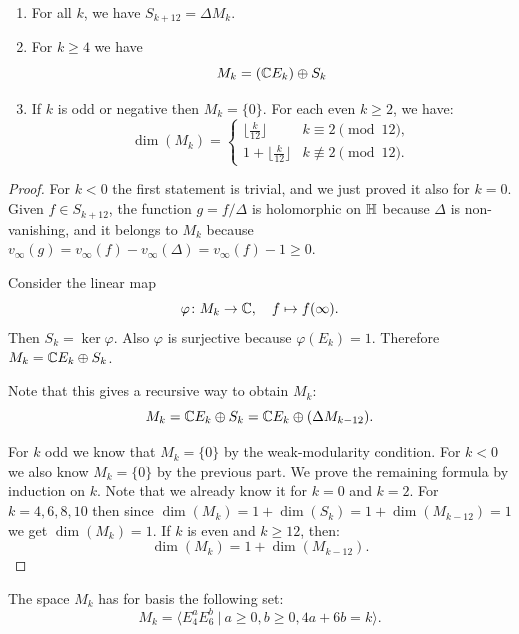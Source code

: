 \begin{corollary}
\begin{enumerate}
  \item For all $k$, we have $S_{k+12} = \Delta M_{k}$.
\item For $k\geq 4$ we have
\[
M_k = (\mathbb{C} E_k) \oplus S_k
\]
\item 
If $k$ is odd or negative then $M_k = \{0\}$. For each even $k\geq 2$, we have:
\[
\dim(M_k)=\begin{cases}
\lfloor\frac k{12}\rfloor & k\equiv 2\pmod{12},\\
1+ \lfloor\frac k{12}\rfloor & k\not\equiv 2\pmod{12}.
\end{cases}
\]
\end{enumerate}
\end{corollary}

\begin{proof}
For $k<0$ the first statement is trivial, and we just proved it also for  $k=0$. Given $f\in S_{k+12}$, the function $g=f/\Delta$ is holomorphic on $\mathbb{H}$ because $\Delta$ is non-vanishing, and it belongs to $M_k$ because $v_\infty(g)=v_\infty(f)-v_\infty(\Delta)=v_\infty(f)-1\geq 0$.

Consider the linear map
\[
\varphi\colon M_k\to\mathbb{C},\quad f\mapsto f(\infty).
\]
Then $S_k=\ker\varphi$. Also $\varphi$ is surjective because $\varphi(E_k)=1$. Therefore $M_k=\mathbb{C} E_k\oplus S_k$.

Note that this gives a recursive way to obtain $M_k$:
\[
M_k = \mathbb{C} E_k \oplus S_k = \mathbb{C} E_k \oplus (\Delta M_{k-12}).
\]

For $k$ odd we know that $M_k=\{0\}$ by the weak-modularity condition. For $k<0$ we also know $M_k=\{0\}$ by the previous part. We prove the remaining formula by induction on $k$. Note that we already know it for $k=0$ and $k=2$. For $k=4, 6, 8, 10$ then since $\dim(M_k)=1+\dim(S_k)=1+\dim(M_{k-12}) = 1$ we get $\dim(M_k)=1$. If $k$ is even and $k\geq 12$, then:
\[
\dim(M_k)=1+\dim(M_{k-12}).
\]
\end{proof}
\begin{corollary}
  The space $M_k$ has for basis the following set:
\[
M_k=\langle E_4^aE_6^b~|~ a\geq 0,b\geq 0, 4a+6b=k\rangle.
\]
\end{corollary}
